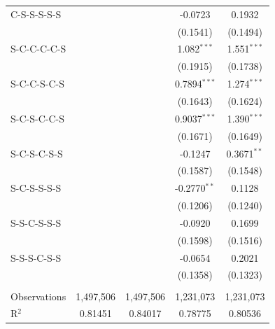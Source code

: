 \begin{table}[htbp]
\begin{tabular}{lcccc}
      C-S-S-S-S-S                     &                &                & -0.0723        & 0.1932\\   
                                      &                &                & (0.1541)       & (0.1494)\\   
      S-C-C-C-C-S                     &                &                & 1.082$^{***}$  & 1.551$^{***}$\\   
                                      &                &                & (0.1915)       & (0.1738)\\   
      S-C-C-S-C-S                     &                &                & 0.7894$^{***}$ & 1.274$^{***}$\\   
                                      &                &                & (0.1643)       & (0.1624)\\   
      S-C-S-C-C-S                     &                &                & 0.9037$^{***}$ & 1.390$^{***}$\\   
                                      &                &                & (0.1671)       & (0.1649)\\   
      S-C-S-C-S-S                     &                &                & -0.1247        & 0.3671$^{**}$\\   
                                      &                &                & (0.1587)       & (0.1548)\\   
      S-C-S-S-S-S                     &                &                & -0.2770$^{**}$ & 0.1128\\   
                                      &                &                & (0.1206)       & (0.1240)\\   
      S-S-C-S-S-S                     &                &                & -0.0920        & 0.1699\\   
                                      &                &                & (0.1598)       & (0.1516)\\   
      S-S-S-C-S-S                     &                &                & -0.0654        & 0.2021\\   
                                      &                &                & (0.1358)       & (0.1323)\\   
       \\
      Observations                    & 1,497,506      & 1,497,506      & 1,231,073      & 1,231,073\\  
      R$^2$                           & 0.81451        & 0.84017        & 0.78775        & 0.80536\\  

\end{tabular}
\end{table}
